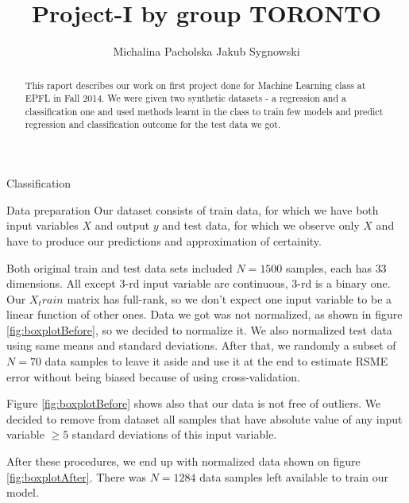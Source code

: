 \documentclass{article}
\title{Project-I by group TORONTO}
\author{Michalina Pacholska \And Jakub Sygnowski}
\begin{document}
\maketitle
\begin{abstract}
    This raport describes our work on first project done for Machine Learning class at EPFL in Fall 2014. We were given two synthetic datasets - a regression and a classification one and used methods learnt in the class to train few models and predict regression and classification outcome for the test data we got. 
\end{abstract}

\begin{section}{Classification}
\begin{subsection}{Data preparation}
Our dataset consists of train data, for which we have both input variables $X$ and output $y$ and test data, for which we observe only $X$ and have to produce our predictions and approximation of certainity.

Both original train and test data sets included $N=1500$ samples, each has $33$ dimensions. All except $3$-rd input variable are continuous, $3$-rd is a binary one. Our $X_train$ matrix has full-rank, so we don't expect one input variable to be a linear function of other ones. 
Data we got was not normalized, as shown in figure \ref{fig:boxplotBefore}, so we decided to normalize it. We also normalized test data using same means and standard deviations. After that, we randomly a subset of $N=70$ data samples to leave it aside and use it at the end to estimate RSME error without being biased because of using cross-validation. 

Figure \ref{fig:boxplotBefore} shows also that our data is not free of outliers. We decided to remove from dataset all samples that have absolute value of any input variable $\ge 5$ standard deviations of this input variable.

After these procedures, we end up with normalized data shown on figure \ref{fig:boxplotAfter}. There was $N=1284$ data samples left available to train our model.


\end{subsection}
\end{section}
\end{document}
